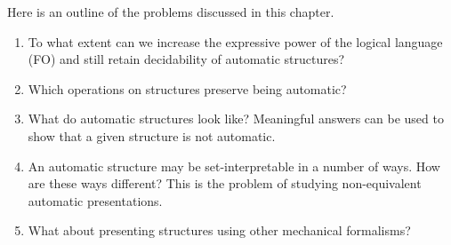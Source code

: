 % 


% 
% 
% 
% 
% 
% 
% 


Here is an outline of the problems discussed in this chapter. 

\begin{enumerate}
\item To what extent can we increase the expressive power of the logical language (FO) and still retain decidability of automatic structures? 
\item Which operations on structures preserve being automatic?
\item What do automatic structures look like? Meaningful answers can be used to show that a given structure is not automatic.
\item An automatic structure may be set-interpretable in a number of ways. How are these ways different?
This is the problem of studying non-equivalent automatic presentations.
\item What about presenting structures using other mechanical formalisms?
\end{enumerate}

